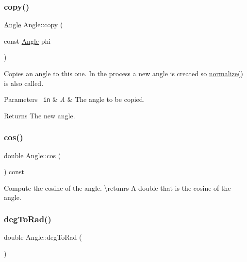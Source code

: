 \subsubsection{\texorpdfstring{copy()}{copy()}}
{\footnotesize\ttfamily \mbox{\hyperlink{class_angle}{Angle}} Angle\+::copy (\begin{DoxyParamCaption}\item[{const \mbox{\hyperlink{class_angle}{Angle}}}]{phi }\end{DoxyParamCaption})\hspace{0.3cm}{\ttfamily [inline]}}



Copies an angle to this one. In the process a new angle is created so {\ttfamily \mbox{\hyperlink{class_angle_a449fc0638ca2e26b4a57d1cce95788e8}{normalize()}}} is also called. 


\begin{DoxyParams}[1]{Parameters}
\mbox{\texttt{ in}}  & {\em A} & The angle to be copied. \\
\hline
\end{DoxyParams}
\begin{DoxyReturn}{Returns}
The new angle. 
\end{DoxyReturn}
\mbox{\label{class_angle_aedc259112dacf9197d787645f7e48911}} 
\subsubsection{\texorpdfstring{cos()}{cos()}}
{\footnotesize\ttfamily double Angle\+::cos (\begin{DoxyParamCaption}{ }\end{DoxyParamCaption}) const\hspace{0.3cm}{\ttfamily [inline]}}



Compute the cosine of the angle. \textbackslash{}retunrs A {\ttfamily double} that is the cosine of the angle. 

\mbox{\label{class_angle_a0db2d1c054e899c7f5d27091a82dec4a}} 
\subsubsection{\texorpdfstring{degToRad()}{degToRad()}}
{\footnotesize\ttfamily double Angle\+::deg\+To\+Rad (\begin{DoxyParamCaption}{ }\end{DoxyParamCaption})\hspace{0.3cm}{\ttfamily [inline]}}



